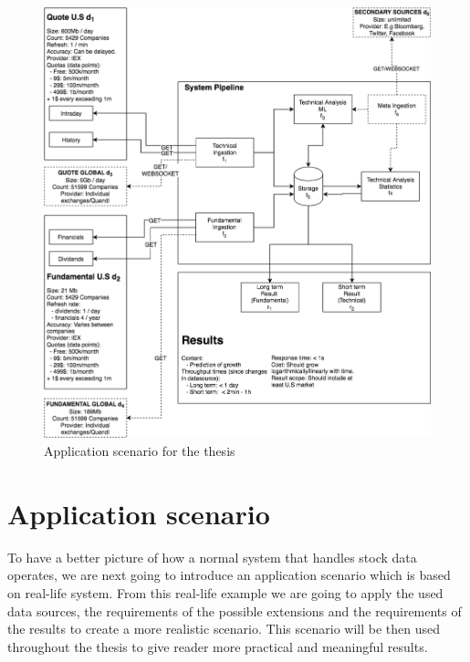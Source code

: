 \documentclass[article,11pt]{article}
\begin{document}
\begin{figure}[h]
    \includegraphics[scale=0.43]{system2} 
    \centering
    \caption{Application scenario for the thesis}
\end{figure}

\section{Application scenario}

To have a better picture of how a normal system that handles stock data operates, we are next going to introduce an application scenario which is based on real-life system.
From this real-life example we are going to apply the used data sources, the requirements of the possible extensions and the requirements of the results to create a more realistic scenario.
This scenario will be then used throughout the thesis to give reader more practical and meaningful results.
\end{document}
